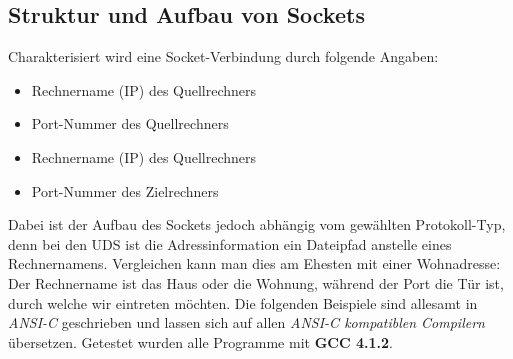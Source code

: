 \documentclass[b5paper,10pt,dvips,fleqn,titlepage,twoside]{book}
\begin{document}
\subsection{Struktur und Aufbau von Sockets}
Charakterisiert wird eine Socket-Verbindung durch folgende Angaben:\\
\begin{itemize}
\item Rechnername (IP) des Quellrechners
\item Port-Nummer des Quellrechners
\item Rechnername (IP) des Quellrechners
\item Port-Nummer des Zielrechners
\end{itemize}
Dabei ist der Aufbau des Sockets jedoch abhängig vom gewählten Protokoll-Typ, denn bei den UDS ist die Adressinformation ein Dateipfad anstelle eines Rechnernamens.
Vergleichen kann man dies am Ehesten mit einer Wohnadresse: Der Rechnername ist das Haus oder die Wohnung, während der Port die Tür ist, durch welche wir eintreten möchten.
Die folgenden Beispiele sind allesamt in \emph{ANSI-C} geschrieben und lassen sich auf allen \emph{ANSI-C kompatiblen Compilern} übersetzen. Getestet wurden alle Programme mit \textbf{GCC 4.1.2}.\\
\end{document}

